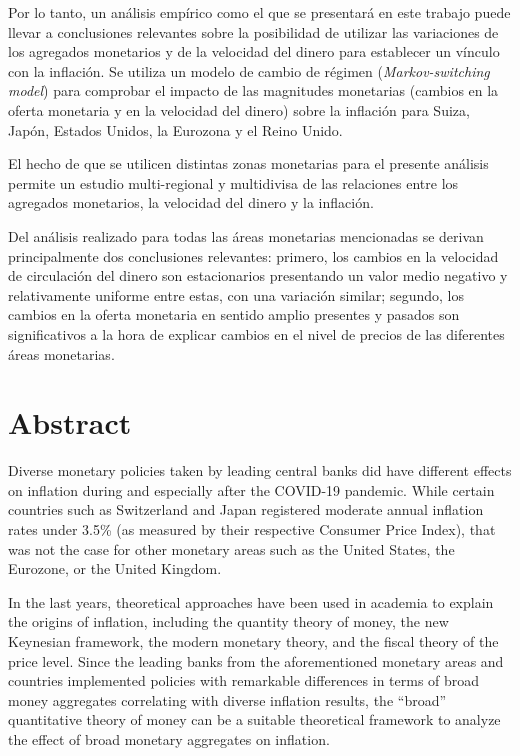 \documentclass[titlepage, 12pt]{article}
\begin{document}
Por lo tanto, un análisis empírico como el que se presentará en este trabajo puede llevar a conclusiones relevantes sobre la posibilidad de utilizar las variaciones de los agregados monetarios y de la velocidad del dinero para establecer un vínculo con la inflación. Se utiliza un modelo de cambio de régimen (\textit{Markov-switching model}) para comprobar el impacto de las magnitudes monetarias (cambios en la oferta monetaria y en la velocidad del dinero) sobre la inflación para Suiza, Japón, Estados Unidos, la Eurozona y el Reino Unido.

El hecho de que se utilicen distintas zonas monetarias para el presente análisis permite un estudio multi-regional y multidivisa de las relaciones entre los agregados monetarios, la velocidad del dinero y la inflación.

Del análisis realizado para todas las áreas monetarias mencionadas se derivan principalmente dos conclusiones relevantes: primero, los cambios en la velocidad de circulación del dinero son estacionarios presentando un valor medio negativo y relativamente uniforme entre estas, con una variación similar; segundo, los cambios en la oferta monetaria en sentido amplio presentes y pasados son significativos a la hora de explicar cambios en el nivel de precios de las diferentes áreas monetarias.

\newpage
\section*{Abstract}
Diverse monetary policies taken by leading central banks did have different effects on inflation during and especially after the COVID-19 pandemic. While certain countries such as Switzerland and Japan registered moderate annual inflation rates under 3.5\% (as measured by their respective Consumer Price Index), that was not the case for other monetary areas such as the United States, the Eurozone, or the United Kingdom.

In the last years, theoretical approaches have been used in academia to explain the origins of inflation, including the quantity theory of money, the new Keynesian framework, the modern monetary theory, and the fiscal theory of the price level. Since the leading banks from the aforementioned monetary areas and countries implemented policies with remarkable differences in terms of broad money aggregates correlating with diverse inflation results, the \enquote{broad} quantitative theory of money can be a suitable theoretical framework to analyze the effect of broad monetary aggregates on inflation.
\end{document}
